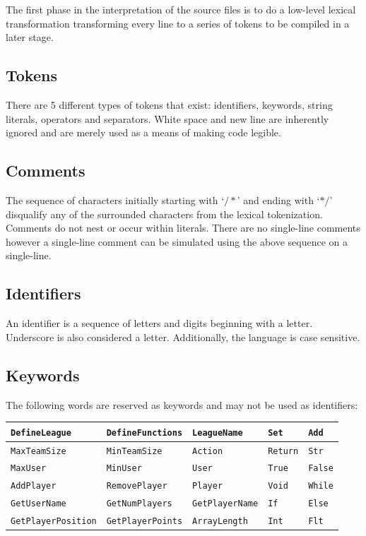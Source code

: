 \documentclass[12pt]{report}
\begin{document}
The first phase in the interpretation of the source files is to do a low-level lexical transformation transforming every line to a series of tokens to be compiled in a later stage.

\subsection{Tokens}

There are 5 different types of tokens that exist: identifiers, keywords, string literals, operators and separators. White space and new line are inherently ignored and are merely used as a means of making code legible.

\subsection{Comments}

The sequence of characters initially starting with `$/*$' and ending with `$*/$' disqualify any of the surrounded characters from the lexical tokenization. Comments do not nest or occur within literals. There are no single-line comments however a single-line comment can be simulated using the above sequence on a single-line.

\subsection{Identifiers}

An identifier is a sequence of letters and digits beginning with a letter. Underscore is also considered a letter. Additionally, the language is case sensitive.

\subsection{Keywords}

The following words are reserved as keywords and may not be used as identifiers:

\begin{center}
\begin{tabular}{ | l | l | l | l | l | }
\hline
\texttt{DefineLeague} & \texttt{DefineFunctions} & \texttt{LeagueName} & \texttt{Set} & \texttt{Add}\\
\hline
\texttt{MaxTeamSize} & \texttt{MinTeamSize} & \texttt{Action} & \texttt{Return} & \texttt{Str}\\
\hline
\texttt{MaxUser} & \texttt{MinUser} & \texttt{User} & \texttt{True} & \texttt{False} \\
\hline
\texttt{AddPlayer} & \texttt{RemovePlayer} & \texttt{Player} & \texttt{Void} & \texttt{While} \\
\hline
\texttt{GetUserName} & \texttt{GetNumPlayers} & \texttt{GetPlayerName} & \texttt{If} & \texttt{Else} \\
\hline
\texttt{GetPlayerPosition} & \texttt{GetPlayerPoints} & \texttt{ArrayLength} & \texttt{Int} & \texttt{Flt}\\
\hline
\end{tabular}
\end{center}
\end{document}
